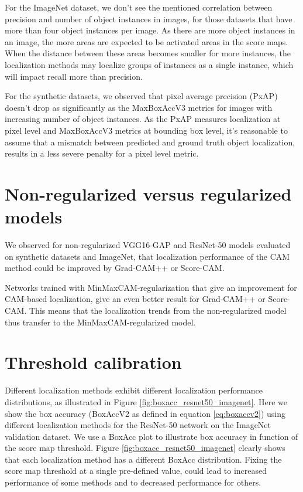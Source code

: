 For the ImageNet dataset, we don't see the mentioned correlation between precision and number of object instances in images, for those datasets that have more than four object instances per image. As there are more object instances in an image, the more areas are expected to be activated areas in the score maps. When the distance between these areas becomes smaller for more instances, the localization methods may localize groups of instances as a single instance, which will impact recall more than precision.

For the synthetic datasets, we observed that pixel average precision (PxAP) doesn’t drop as significantly as the MaxBoxAccV3 metrics for images with increasing number of object instances. As the PxAP measures localization at pixel level and MaxBoxAccV3 metrics at bounding box level, it's reasonable to assume that a mismatch between predicted and ground truth object localization, results in a less severe penalty for a pixel level metric.

\section{Non-regularized versus regularized models}
We observed for non-regularized VGG16-GAP and ResNet-50 models evaluated on synthetic datasets and ImageNet, that localization performance of the CAM method could be improved by Grad-CAM++ or Score-CAM.

Networks trained with MinMaxCAM-regularization that give an improvement for CAM-based localization, give an even better result for Grad-CAM++ or Score-CAM. This means that the localization trends from the non-regularized model thus transfer to the MinMaxCAM-regularized model.

\section{Threshold calibration}
Different localization methods exhibit different localization performance distributions, as illustrated in Figure \ref{fig:boxacc_resnet50_imagenet}. Here we show the box accuracy (BoxAccV2 as defined in equation \ref{eq:boxaccv2}) using different localization methods for the ResNet-50 network on the ImageNet validation dataset. We use a BoxAcc plot to illustrate box accuracy in function of the score map threshold. Figure \ref{fig:boxacc_resnet50_imagenet} clearly shows that each localization method has a different BoxAcc distribution. Fixing the score map threshold at a single pre-defined value, could lead to increased performance of some methods and to decreased performance for others. 

